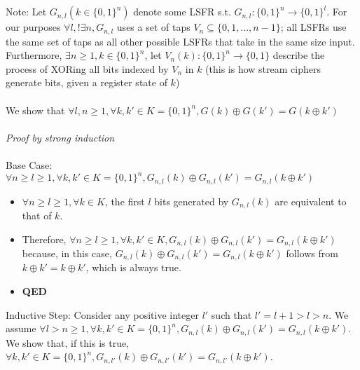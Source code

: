 \documentclass[]{article}
\begin{document}
\section{}
Note: Let $G_{n,l}(k \in \{0,1\}^n)$ denote some LSFR s.t. $G_{n,l}: \{0,1\}^n \rightarrow \{0,1\}^l$. For our purposes $\forall l, !\exists n, G_{n,l}$ uses a set of taps $V_n \subseteq \{0, 1, ..., n -1\}$; all LSFRs use the same set of taps as all other possible LSFRs that take in the same size input. Furthermore, $\exists n \geq 1, k \in \{0,1\}^n$, let $V_n(k):\{0,1\}^n \rightarrow \{0,1\}$ describe the process of XORing all bits indexed by $V_n$ in $k$ (this is how stream ciphers generate bits, given a register state of $k$)
\\\\ 
We show that $\forall l, n \geq 1, \forall k, k' \in K = \{0,1\}^n, G(k) \oplus G(k') = G(k \oplus k')$
\\\\
\textit{Proof by strong induction}
\\\\
Base Case: $\forall n \geq l \geq 1, \forall k, k' \in K = \{0,1\}^n, G_{n,l}(k) \oplus G_{n,l}(k') = G_{n,l}(k \oplus k')$
\begin{itemize}
	\item $\forall n \geq l \geq 1, \forall k \in K$, the first $l$ bits generated by $G_{n,l}(k)$ are equivalent to that of $k$. %
	\item Therefore, $\forall n \geq l \geq 1, \forall k, k' \in K, G_{n,l}(k) \oplus G_{n,l}(k') = G_{n,l}(k \oplus k')$ because, in this case, $G_{n,l}(k) \oplus G_{n,l}(k') = G_{n,l}(k \oplus k')$ follows from $k \oplus k' = k \oplus k'$, which is always true.
	\item \textbf{QED}
\end{itemize}
Inductive Step: Consider any positive integer $l'$ such that $l' = l + 1 > l > n$. We assume $\forall l > n \geq 1, \forall k, k' \in K = \{0,1\}^n, G_{n,l}(k) \oplus G_{n,l}(k') = G_{n,l}(k \oplus k')$. We show that, if this is true, $\forall k, k' \in K = \{0,1\}^n, G_{n,l'}(k) \oplus G_{n,l'}(k') = G_{n,l'}(k \oplus k')$.
\end{document}
